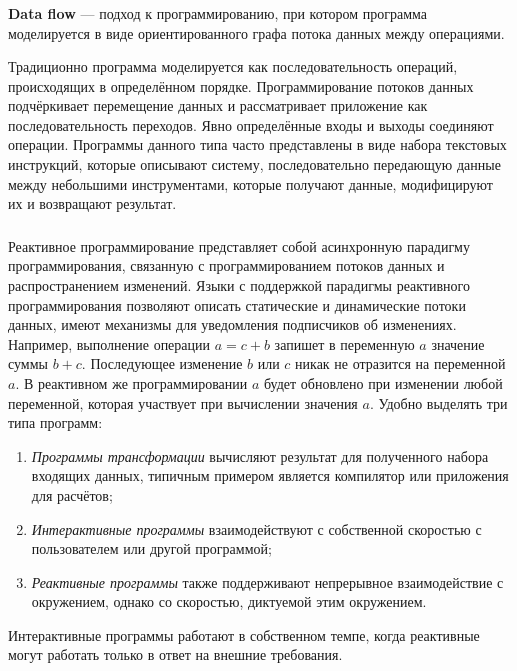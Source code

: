 \subsubsection{}
\label{sec:analysis:research:mobArch:dataflow}

\textbf{Data flow} --- подход к программированию, при котором программа моделируется в виде ориентированного графа потока данных между операциями\cite{wiki:data-flow}.

Традиционно программа моделируется как последовательность операций, происходящих в определённом порядке. Программирование потоков данных подчёркивает перемещение данных и рассматривает приложение как последовательность переходов. Явно определённые входы и выходы соединяют операции. Программы данного типа часто представлены в виде набора текстовых инструкций, которые описывают систему, последовательно передающую данные между небольшими инструментами, которые получают данные, модифицируют их и возвращают результат. 

\subsubsection{}
\label{sec:analysis:research:mobArch:reactive}

Реактивное программирование представляет собой асинхронную парадигму программирования, связанную с программированием потоков данных и распространением изменений. Языки с поддержкой парадигмы реактивного программирования позволяют описать статические и динамические потоки данных, имеют механизмы для уведомления подписчиков об изменениях. Например, выполнение операции \(a = c + b\) запишет в переменную \(a\) значение суммы \(b + c\). Последующее изменение \(b\) или \(c\) никак не отразится на переменной \(a\). В реактивном же программировании \(a\) будет обновлено при изменении любой переменной, которая участвует при вычислении значения \(a\).
Удобно выделять три типа программ:
\begin{enumerate}
	\item \emph{Программы трансформации} вычисляют результат для полученного набора входящих данных, типичным примером является компилятор или приложения для расчётов;
	\item \emph{Интерактивные программы} взаимодействуют с собственной скоростью с пользователем или другой программой;
	\item \emph{Реактивные программы} также поддерживают непрерывное взаимодействие с окружением, однако со скоростью, диктуемой этим окружением.
\end{enumerate}
Интерактивные программы работают в собственном темпе, когда реактивные могут работать только в ответ на внешние требования.